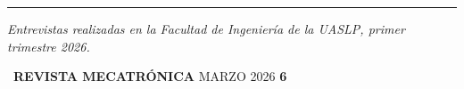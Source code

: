 \documentclass[10pt]{article}
\newcommand{\lineaGrisH}{%
  \noindent{\color{lineaGris}\rule{\linewidth}{0.4pt}}\par}
\newcommand{\pieRevista}[2]{%
  \vspace*{\fill}\vspace{3pt}%
  \lineaGrisH\vspace{3pt}%
  {\footnotesize%
    \colorbox{azulOscuro}{\textcolor{blanco}{\footnotesize\textbf{\quad[R]\quad}}}\,%
    \textcolor{blanco}{\textbf{REVISTA MECATR\'ONICA}}\hfill
    \textcolor{grisTexto}{MARZO 2026\quad}%
    \textcolor{#1}{\textbf{#2}}}}
\begin{document}
\begin{minipage}{\dimexpr\paperwidth-1.8cm}
\begin{minipage}[t]{0.35\linewidth}
\vspace{6pt}
{\color{lineaGris}\rule{\linewidth}{0.4pt}}\par\vspace{5pt}
{\fontsize{6.5}{8.5}\selectfont\color{lineaAzul}
  \textit{Entrevistas realizadas en la Facultad de Ingenier\'ia
  de la UASLP, primer trimestre 2026.}}
\end{minipage}

\pieRevista{naranja}{6}
\vspace*{0.45cm}
\end{minipage}

\clearpage
\restoregeometry
\pagestyle{fancy}

\clearpage
{}
\pagestyle{empty}
\AddToShipoutPictureBG*{%
  \AtPageLowerLeft{%
    \color{fondoOscuro}\rule{\paperwidth}{\paperheight}}}
\end{document}
